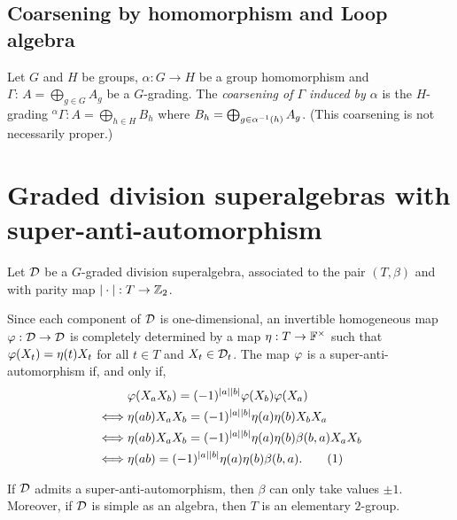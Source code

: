 \documentclass{amsbook}
\newcommand\numberthis{\addtocounter{equation}{1}\tag{\theequation}}
\begin{document}



\section{Coarsening by homomorphism and Loop algebra}

\begin{defi}
	Let $G$ and $H$ be groups, $\alpha:G\to H$ be a group homomorphism and $\Gamma:\,A=\bigoplus_{g\in G} A_g$ be a $G$-grading. The \emph{coarsening of $\Gamma$ induced by $\alpha$} is the $H$-grading ${}^\alpha \Gamma: A= \bigoplus_{h\in H} B_h$ where
	$ B_h = \bigoplus_{g\in \alpha^{-1} (h)} A_g$. (This coarsening is not necessarily proper.)
\end{defi}


\chapter{Graded division superalgebras with super-anti-automorphism}


Let $\mathcal{D}$ be a $G$-graded division superalgebra, associated to the pair $(T, \beta)$ and with parity map $| \cdot |: T \to \mathbb{Z}_2$.

Since each component of $\mathcal{D}$ is one-dimensional, an invertible homogeneous map $\varphi: \mathcal{D} \to \mathcal{D}$ is completely determined by a map $\eta: T \to \mathbb{F}^\times$ such that $\varphi(X_t) = \eta(t) X_t$ for all $t\in T$ and $X_t\in \mathcal{D}_t$. The map $\varphi$ is a super-anti-automorphism if, and only if,
%
\begin{align*}
    &\vphi(X_a X_b) = (-1)^{|a||b|} \vphi(X_b) \vphi(X_a)\\ \iff& \eta(ab)X_a X_b = (-1)^{|a||b|} \eta(a) \eta(b) X_b X_a\\ \iff& \eta(ab)X_a X_b = (-1)^{|a||b|} \eta(a) \eta(b) \beta(b,a) X_a X_b\\ \iff& \eta(ab) = (-1)^{|a||b|} \eta(a) \eta(b) \beta(b,a). \numberthis \label{eq:eta-super-anti-auto}
\end{align*}

\begin{prop}
    If $\mathcal{D}$ admits a super-anti-automorphism, then $\beta$ can only take values $\pm 1$. Moreover, if $\mathcal{D}$ is simple as an algebra, then $T$ is an elementary $2$-group.
\end{prop}
\end{document}
